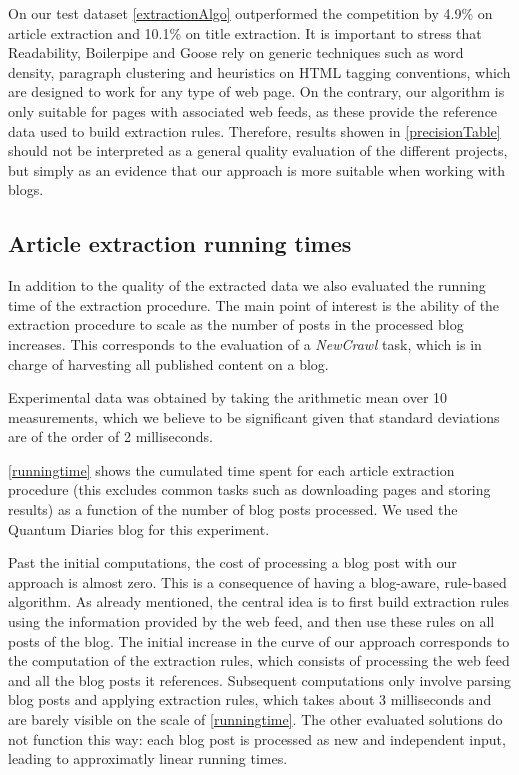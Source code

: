 \precisionTable

On our test dataset \autoref{extractionAlgo} outperformed the competition by 4.9\% on article extraction and 10.1\% on title extraction. It is important to stress that Readability, Boilerpipe and Goose rely on generic techniques such as word density, paragraph clustering and heuristics on HTML tagging conventions, which are designed to work for any type of web page. On the contrary, our algorithm is only suitable for pages with associated web feeds, as these provide the reference data used to build extraction rules. Therefore, results showen in \autoref{precisionTable} should not be interpreted as a general quality evaluation of the different projects, but simply as an evidence that our approach is more suitable when working with blogs.


\subsection{Article extraction running times}

In addition to the quality of the extracted data we also evaluated the running time of the extraction procedure. The main point of interest is the ability of the extraction procedure to scale as the number of posts in the processed blog increases. This corresponds to the evaluation of a \emph{NewCrawl} task, which is in charge of harvesting all published content on a blog.

Experimental data was obtained by taking the arithmetic mean over 10 measurements, which we believe to be significant given that standard deviations are of the order of 2 milliseconds.

\autoref{runningtime} shows the cumulated time spent for each article extraction procedure (this excludes common tasks such as downloading pages and storing results) as a function of the number of blog posts processed. We used the Quantum Diaries \cite{quantumdiaries} blog for this experiment.



Past the initial computations, the cost of processing a blog post with our approach is almost zero. This is a consequence of having a blog-aware, rule-based algorithm. As already mentioned, the central idea is to first build extraction rules using the information provided by the web feed, and then use these rules on all posts of the blog. The initial increase in the curve of our approach corresponds to the computation of the extraction rules, which consists of processing the web feed and all the blog posts it references. Subsequent computations only involve parsing blog posts and applying extraction rules, which takes about 3 milliseconds and are barely visible on the scale of \autoref{runningtime}. The other evaluated solutions do not function this way: each blog post is processed as new and independent input, leading to approximatly linear running times.


